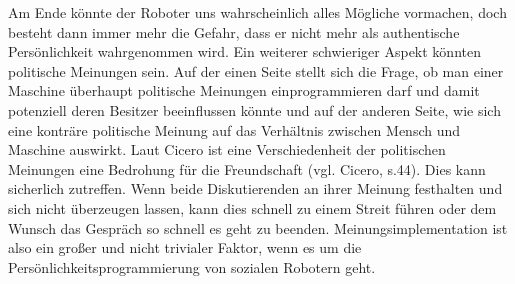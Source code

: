 \documentclass[12pt]{article}
\begin{document}
Am Ende könnte der Roboter uns wahrscheinlich alles Mögliche vormachen, doch besteht dann immer mehr die Gefahr, dass er nicht mehr als authentische Persönlichkeit wahrgenommen wird.\newline
Ein weiterer schwieriger Aspekt könnten politische Meinungen sein. Auf der einen Seite stellt sich die Frage, ob man einer Maschine überhaupt politische Meinungen einprogrammieren darf und damit potenziell deren Besitzer beeinflussen könnte und auf der anderen Seite, wie sich eine konträre politische Meinung auf das Verhältnis zwischen Mensch und Maschine auswirkt. Laut Cicero ist eine Verschiedenheit der politischen Meinungen eine Bedrohung für die Freundschaft (vgl. Cicero, s.44). Dies kann sicherlich zutreffen. Wenn beide Diskutierenden an ihrer Meinung festhalten und sich nicht überzeugen lassen, kann dies schnell zu einem Streit führen oder dem Wunsch das Gespräch so schnell es geht zu beenden. Meinungsimplementation ist also ein großer und nicht trivialer Faktor, wenn es um die Persönlichkeitsprogrammierung von sozialen Robotern geht.\newline
 \newline
 
%
%
\end{document}
